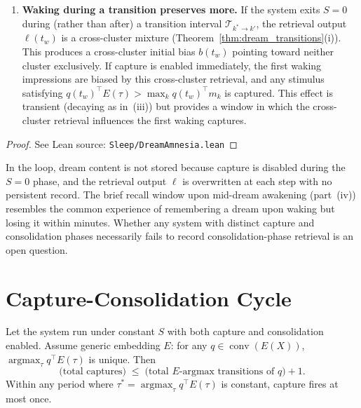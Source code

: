\begin{theorem}
\begin{enumerate}
\item \textbf{Waking during a transition preserves more.}  If the system exits $S = 0$ during (rather than after) a transition interval $\mathcal{T}_{k^* \to k'}$, the retrieval output $\ell(t_w)$ is a cross-cluster mixture (Theorem~\ref{thm:dream_transitions}(i)).  This produces a cross-cluster initial bias $b(t_w)$ pointing toward neither cluster exclusively.  If capture is enabled immediately, the first waking impressions are biased by this cross-cluster retrieval, and any stimulus satisfying $q(t_w)^\top E(\tau) > \max_k q(t_w)^\top m_k$ is captured.  This effect is transient (decaying as in~(iii)) but provides a window in which the cross-cluster retrieval influences the first waking captures.
\end{enumerate}
\end{theorem}

\begin{proof}
\leanok
{}
See Lean source: \texttt{Sleep/DreamAmnesia.lean}
\end{proof}

\begin{remark}
\label{rem:dream_amnesia}
\leanok
{}
In the loop, dream content is not stored because capture is disabled during the $S = 0$ phase, and the retrieval output $\ell$ is overwritten at each step with no persistent record.  The brief recall window upon mid-dream awakening (part~(iv)) resembles the common experience of remembering a dream upon waking but losing it within minutes.  Whether any system with distinct capture and consolidation phases necessarily fails to record consolidation-phase retrieval is an open question.
\end{remark}

\chapter{Capture-Consolidation Cycle}\label{ch:capture}

\begin{theorem}
\label{thm:capture_argmax}
\leanok
{}
Let the system run under constant $S$ with both capture and consolidation enabled.  Assume generic embedding $E$: for any $q \in \operatorname{conv}(E(X))$, $\operatorname{argmax}_\tau q^\top E(\tau)$ is unique.  Then
\[
\text{(total captures)} \;\leq\; \text{(total $E$-argmax transitions of $q$)} + 1.
\]
Within any period where $\tau^* = \operatorname{argmax}_\tau q^\top E(\tau)$ is constant, capture fires at most once.
\end{theorem}

